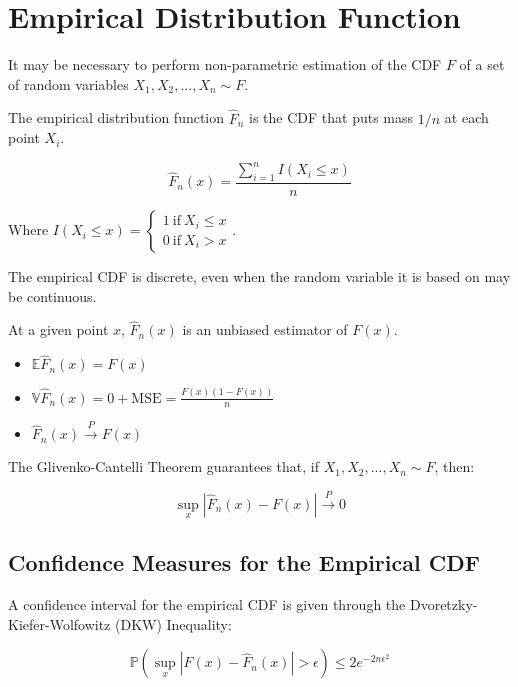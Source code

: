 \section{Empirical Distribution Function}
It may be necessary to perform non-parametric estimation of the CDF $F$ of a set of random variables $X_1, X_2, ... , X_n \sim F$. 

The empirical distribution function $\hat{F}_n$ is the CDF that puts mass $1/n$ at each point $X_i$.

\begin{equation}
\hat{F}_n(x) = \frac{\sum_{i=1}^n I(X_i \leq x)}{n}
\end{equation}

Where $I(X_i \leq x) = \left\{\begin{array}{c} 1\ \mathrm{if\ } X_i \leq x\\ 0\ \mathrm{if\ } X_i > x \end{array} \right.$. 

The empirical CDF is discrete, even when the random variable it is based on may be continuous. 

At a given point $x$, $\hat{F}_n(x)$ is an unbiased estimator of $F(x)$. 

\begin{itemize}
\item $\mathbb{E}\hat{F}_n(x) = F(x)$
\item $\mathbb{V}\hat{F}_n(x) = 0+\mathrm{MSE} = \frac{F(x)(1-F(x))}{n}$
\item $\hat{F}_n(x) \xrightarrow{P} F(x)$
\end{itemize}

The Glivenko-Cantelli Theorem guarantees that, if $X_1,X_2,...,X_n \sim F$, then:

\begin{equation}
\sup_x |\hat{F}_n(x) - F(x)|\xrightarrow{P} 0
\end{equation}

\subsection{Confidence Measures for the Empirical CDF}
A confidence interval for the empirical CDF is given through the Dvoretzky-Kiefer-Wolfowitz (DKW) Inequality:

\begin{equation}
\mathbb{P}\left(\sup_x|F(x) - \hat{F}_n(x)|>\epsilon \right)\leq 2 e^{-2n\epsilon^2}
\end{equation}

